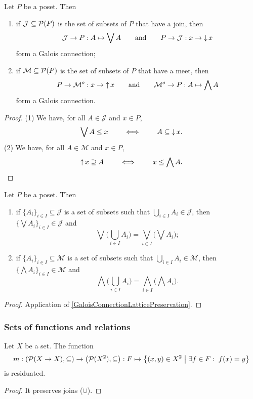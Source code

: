 \begin{proposition} \label{upsetDownsetConnections}
Let $P$ be a poset. Then
\begin{enumerate}
\item if $\mathcal{J}\subseteq \operatorname{\mathcal{P}}(P)$ is the set of subsets of $P$ that have a join, then
\[ \mathcal{J} \to P: A\mapsto \bigvee A \qquad\text{and}\qquad P\to \mathcal{J}: x\to \operatorname{\downarrow} x \]
form a Galois connection;
\item if $\mathcal{M}\subseteq \operatorname{\mathcal{P}}(P)$ is the set of subsets of $P$ that have a meet, then
\[ P\to \mathcal{M}^o: x\to \operatorname{\uparrow} x \qquad\text{and}\qquad \mathcal{M}^o \to P: A\mapsto \bigwedge A \]
form a Galois connection. 
\end{enumerate}
\end{proposition}
\begin{proof}
(1) We have, for all $A\in \mathcal{J}$ and $x\in P$,
\[ \bigvee A \leq x \qquad \iff\qquad A\subseteq \operatorname{\downarrow} x. \]
(2) We have, for all $A\in \mathcal{M}$ and $x\in P$,
\[ \operatorname{\uparrow} x \supseteq A \qquad \iff\qquad x\leq \bigwedge A. \]
\end{proof}
\begin{corollary} \label{joinMeetUnion}
Let $P$ be a poset. Then
\begin{enumerate}
\item if $\{A_i\}_{i\in I}\subseteq \mathcal{J}$ is a set of subsets such that $\bigcup_{i\in I}A_i \in \mathcal{J}$, then $\big\{\bigvee A_i\big\}_{i\in I} \in \mathcal{J}$ and
\[ \bigvee \Big(\bigcup_{i\in I}A_i\Big) = \bigvee_{i\in I}\Big(\bigvee A_i\Big); \]
\item if $\{A_i\}_{i\in I}\subseteq \mathcal{M}$ is a set of subsets such that $\bigcup_{i\in I}A_i \in \mathcal{M}$, then $\big\{\bigwedge A_i\big\}_{i\in I} \in \mathcal{M}$ and
\[ \bigwedge \Big(\bigcup_{i\in I}A_i\Big) = \bigwedge_{i\in I}\Big(\bigwedge A_i\Big). \]
\end{enumerate}
\end{corollary}
\begin{proof}
Application of \ref{GaloisConnectionLatticePreservation}.
\end{proof}

\subsubsection{Sets of functions and relations}
\begin{proposition} \label{setOfFunctionsToRelationGaloisConnection}
Let $X$ be a set. The function
\[ m: \left( \operatorname{\mathcal{P}}(X\to X), \subseteq \right) \to \left( \operatorname{\mathcal{P}}(X^2), \subseteq \right): F \mapsto \left\{ (x,y)\in X^2 \;\middle|\; \exists f\in F: \; f(x) = y \right\} \]
is residuated.
\end{proposition}
\begin{proof}
It preserves joins ($\cup$).
\end{proof}

